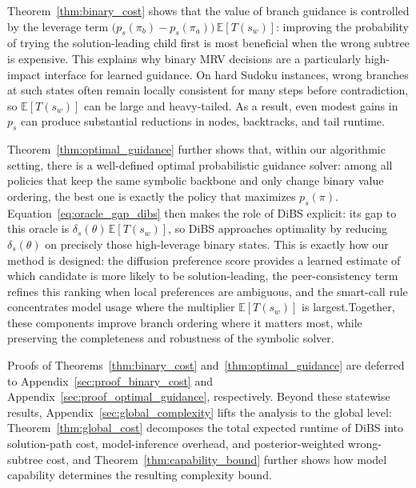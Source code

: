\documentclass[lettersize,journal]{IEEEtran}
\begin{document}
Theorem~\ref{thm:binary_cost} shows that the value of branch guidance is controlled by the leverage term
$\bigl(p_s(\pi_b)-p_s(\pi_a)\bigr)\,\mathbb{E}[T(s_w)]$:
improving the probability of trying the solution-leading child first is most beneficial when the wrong subtree is expensive.
This explains why binary MRV decisions are a particularly high-impact interface for learned guidance.
On hard Sudoku instances, wrong branches at such states often remain locally consistent for many steps before contradiction,
so $\mathbb{E}[T(s_w)]$ can be large and heavy-tailed.
As a result, even modest gains in $p_s$ can produce substantial reductions in nodes, backtracks, and tail runtime.

Theorem~\ref{thm:optimal_guidance} further shows that, within our algorithmic setting,
there is a well-defined optimal probabilistic guidance solver:
among all policies that keep the same symbolic backbone and only change binary value ordering,
the best one is exactly the policy that maximizes $p_s(\pi)$.
Equation~\eqref{eq:oracle_gap_dibs} then makes the role of DiBS explicit:
its gap to this oracle is $\delta_s(\theta)\,\mathbb{E}[T(s_w)]$,
so DiBS approaches optimality by reducing $\delta_s(\theta)$ on precisely those high-leverage binary states.
This is exactly how our method is designed:
the diffusion preference score provides a learned estimate of which candidate is more likely to be solution-leading,
the peer-consistency term refines this ranking when local preferences are ambiguous,
and the smart-call rule concentrates model usage where the multiplier $\mathbb{E}[T(s_w)]$ is largest.Together, these components improve branch ordering where it matters most, while preserving the completeness and robustness of the symbolic solver.

Proofs of Theorems~\ref{thm:binary_cost} and~\ref{thm:optimal_guidance} are deferred to Appendix~\ref{sec:proof_binary_cost} and Appendix~\ref{sec:proof_optimal_guidance}, respectively. Beyond these statewise results, Appendix~\ref{sec:global_complexity} lifts the analysis to the global level: Theorem~\ref{thm:global_cost} decomposes the total expected runtime of DiBS into solution-path cost, model-inference overhead, and posterior-weighted wrong-subtree cost, and Theorem~\ref{thm:capability_bound} further shows how model capability determines the resulting complexity bound.
\end{document}
